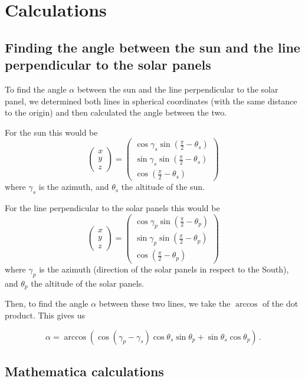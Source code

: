 \documentclass{article}
\newcommand{\vvec}[1]{\begin{pmatrix} #1 \end{pmatrix}}
\begin{document}
	\section{Calculations}\label{sec:calculations}
		\subsection{Finding the angle between the sun and the line perpendicular to the solar panels}\label{subsec:findingTheAngleBetweenTheSunAndTheLinePerpendicularToTheSolarPanels}
			To find the angle $\alpha$ between the sun and the line perpendicular to the solar panel, we determined both lines in spherical coordinates (with the same distance to the origin) and then calculated the angle between the two.

			
			For the sun this would be
			\[ 
				\vvec{x \\ y \\ z} = 
				\vvec{\cos \gamma_s \sin \left(\frac{\pi}{2} - \theta_s\right) \\
					\sin \gamma_s \sin \left(\frac{\pi}{2} - \theta_s\right) \\
					\cos \left(\frac{\pi}{2} - \theta_s\right)}
			 \]
			 where $ \gamma_s $ is the azimuth, and $ \theta_s $ the altitude of the sun.

			 
			 For the line perpendicular to the solar panels this would be
			 \[ 
				 \vvec{x \\ y \\ z} = 
				 \vvec{\cos \gamma_p \sin \left(\frac{\pi}{2} - \theta_p\right) \\
				 	\sin \gamma_p \sin \left(\frac{\pi}{2} - \theta_p\right) \\
				 	\cos \left(\frac{\pi}{2} - \theta_p\right)}
			  \]
			  where $ \gamma_p $ is the azimuth (direction of the solar panels in respect to the South), and $ \theta_p $ the altitude of the solar panels.
			  
			  Then, to find the angle $\alpha$ between these two lines, we take the $ \arccos $ of the dot product.
			  This gives us
			  
			  \[ 
				  \alpha = \arccos (\cos (\gamma_p - \gamma_s) \cos \theta_s \sin \theta_p + \sin \theta_s \cos \theta_p)\,.
			   \]
			   
			   \subsection{Mathematica calculations}\label{subsec:mathematicaCalculations}
			   
\end{document}
